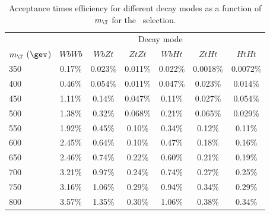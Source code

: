 \begin{table}
\begin{center}
\begin{tabular}{l c c c c c c}
\toprule
 & \multicolumn{6}{c}{Decay mode} \\
$m_{\T}$ ($\gev$) & $WbWb$ & $WbZt$ & $ZtZt$ & $WbHt$ & $ZtHt$ & $HtHt$ \\
\midrule
350 & 0.17\% & 0.023\% & 0.011\% & 0.022\% & 0.0018\% & 0.0072\% \\
400 & 0.46\% & 0.054\% & 0.011\% & 0.047\% & 0.023\% & 0.014\% \\
450 & 1.11\% & 0.14\% & 0.047\% & 0.11\% & 0.027\% & 0.054\% \\
500 & 1.38\% & 0.32\% & 0.068\% & 0.21\% & 0.065\% & 0.029\% \\
550 & 1.92\% & 0.45\% & 0.10\% & 0.34\% & 0.12\% & 0.11\% \\
600 & 2.45\% & 0.64\% & 0.10\% & 0.47\% & 0.18\% & 0.16\% \\
650 & 2.46\% & 0.74\% & 0.22\% & 0.60\% & 0.21\% & 0.19\% \\
700 & 3.21\% & 0.97\% & 0.24\% & 0.74\% & 0.27\% & 0.25\% \\
750 & 3.16\% & 1.06\% & 0.29\% & 0.94\% & 0.34\% & 0.29\% \\
800 & 3.57\% & 1.35\% & 0.30\% & 1.06\% & 0.38\% & 0.34\% \\
\bottomrule
\end{tabular}
\caption{Acceptance times efficiency for different \TTbar decay modes as a function of $m_{\T}$ for the \tight\ selection.}
\label{tab:eff_tight}
\end{center}
\end{table}





